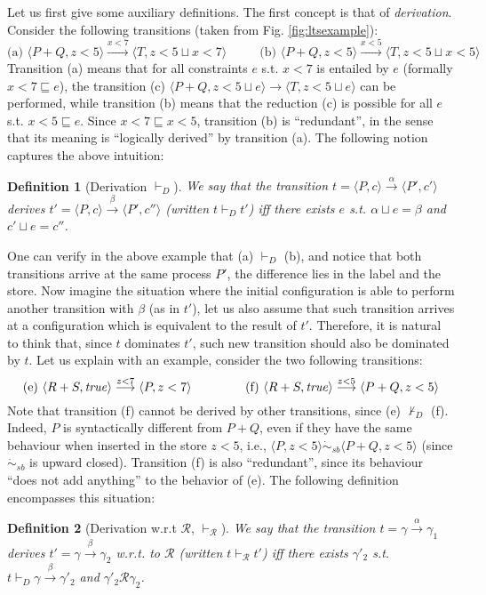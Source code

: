 \documentclass[copyright,creativecommons]{eptcs}
\newcommand{\true}{{\it true}}
\newcommand{\rrarrow}{\longrightarrow}
\newcommand{\pairccp}[2]{\langle #1,#2 \rangle}
\newcommand{\trans}[1]{\stackrel{#1}{\rrarrow}}
\newcommand{\satbis}{\dot{\sim}_{sb}}
\newtheorem{definition}{Definition}
\newcommand{\R}{\mathcal{R}}
\newcommand{\A}{\alpha}
\newcommand{\B}{\beta}
\newcommand{\G}{\gamma}
\newcommand{\conf}[2]{\pairccp{#1}{#2}}
\newcommand{\deriv}{\vdash_D}
\newcommand{\derivR}{\vdash_{\R}}
\newcommand{\transition}[5]{\conf{#1}{#2} \trans{#3} \conf{#4}{#5}}
\newcommand{\lub}{\sqcup}
\newcommand{\entailed}{\sqsubseteq}
\begin{document}
Let us first give some auxiliary definitions. The first concept is that of \emph{derivation}.
Consider the following transitions (taken from Fig. \ref{fig:ltsexample}):
\[\mbox{(a) } \pairccp{P+Q}{z<5} \trans{x<7} \pairccp{T}{z<5 \lub x<7} ~~~~~~~~~~~~
\mbox{(b) } \pairccp{P+Q}{z<5} \trans{x<5} \pairccp{T}{z<5 \lub x<5} \]
Transition (a) means that for all constraints $e$ s.t. $x<7$ is entailed by $e$ (formally $x<7 \entailed e$),
the transition (c) $\pairccp{P+Q}{z<5 \lub e} \trans{} \pairccp{T}{z<5 \lub e}$ can be performed,
while transition (b) means that the reduction (c) is possible for all $e$ s.t. $x<5 \entailed e$.
Since $x<7 \entailed x<5$, transition (b) is ``redundant'', in the sense that its meaning is ``logically derived'' by transition (a).
The following notion captures the above intuition:
\begin{definition}[Derivation $\deriv$]
\label{def:deriv}
We say that the transition $t = \transition{P}{c}{\A}{P'}{c'}$ derives $t' =
\transition{P}{c}{\B}{P'}{c''}$ (written $t \deriv t'$) iff there exists $e$ s.t. $\A \lub e = \B$ and $c' \lub e = c''$.
\end{definition}

One can verify in the above example that (a) $\deriv$ (b), and
notice that both transitions arrive at the same process $P'$,
the difference lies in the label and the store.
Now imagine the situation where the initial configuration is able
to perform another transition with $\B$ (as in $t'$),
let us also assume that such transition arrives at a configuration which is
equivalent to the result of $t'$. Therefore,
it is natural to think that, since $t$ dominates $t'$,
such new transition should also be dominated by $t$.
Let us explain with an example, consider the two following transitions:
\[\mbox{(e) } \pairccp{R+S}{\true} \trans{z<7} \pairccp{P}{z<7} ~~~~~~~~~~~~
\mbox{ (f) }\pairccp{R+S}{\true} \trans{z<5} \pairccp{P+Q}{z<5} \]
Note that transition (f) cannot be derived by other transitions, since (e) $\not \deriv$ (f).
Indeed, $P$ is syntactically different from $P+Q$, even if they have the same behaviour when inserted in the store $z<5$, i.e.,
$\pairccp{P}{z<5}\satbis \pairccp{P+Q}{z<5}$ (since $\satbis$ is upward closed). Transition (f)
is also ``redundant'', since its behaviour ``does not add anything'' to the behavior of (e).
The following definition encompasses this situation:

\begin{definition}[Derivation w.r.t $\R$, $\derivR$]
\label{def:derivR}
We say that the transition $t = \G \trans{\A} \G_1$ derives $t' =
\G \trans{\B} \G_2$ w.r.t. to $\R$ (written $t \derivR t'$) iff
there exists $\G'_2$ s.t. $t \deriv \G \trans{\B} \G'_2$ and $\G'_2 \R \G_2$.
\end{definition}
\end{document}
